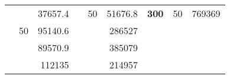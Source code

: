 \begin{table}[H]
\begin{tabular}{|ccrccrccc}
\rowcolor[HTML]{DDFDFF} 
\multicolumn{1}{|c|}{\cellcolor[HTML]{FFFFC7}}                                & \multicolumn{1}{c|}{\cellcolor[HTML]{DDFDFF}}                      & \multicolumn{1}{r|}{\cellcolor[HTML]{DAE8FC}37657.4}   & \multicolumn{1}{c|}{\cellcolor[HTML]{FFFFC7}}                                & \multicolumn{1}{c|}{\multirow{-10}{*}{\cellcolor[HTML]{DDFDFF}50}}  & \multicolumn{1}{r|}{\cellcolor[HTML]{DDFDFF}51676.8}   & \multicolumn{1}{c|}{\multirow{-19}{*}{\cellcolor[HTML]{FFFFC7}\textbf{300}}} & \multicolumn{1}{c|}{\multirow{-10}{*}{\cellcolor[HTML]{DDFDFF}50}} & \multicolumn{1}{r|}{\cellcolor[HTML]{DDFDFF}769369}    \\ \cline{3-3} \cline{5-9} 
\multicolumn{1}{|c|}{\cellcolor[HTML]{FFFFC7}}                                & \multicolumn{1}{c|}{\multirow{-10}{*}{\cellcolor[HTML]{DDFDFF}50}} & \multicolumn{1}{r|}{\cellcolor[HTML]{DDFDFF}95140.6}   & \multicolumn{1}{c|}{\cellcolor[HTML]{FFFFC7}}                                & \multicolumn{1}{c|}{\cellcolor[HTML]{DAE8FC}}                       & \multicolumn{1}{r|}{\cellcolor[HTML]{DAE8FC}286527}    &                                                                              &                                                                    &                                                        \\ \cline{2-3} \cline{6-6}
\multicolumn{1}{|c|}{\cellcolor[HTML]{FFFFC7}}                                & \multicolumn{1}{c|}{\cellcolor[HTML]{DAE8FC}}                      & \multicolumn{1}{r|}{\cellcolor[HTML]{DAE8FC}89570.9}   & \multicolumn{1}{c|}{\cellcolor[HTML]{FFFFC7}}                                & \multicolumn{1}{c|}{\cellcolor[HTML]{DAE8FC}}                       & \multicolumn{1}{r|}{\cellcolor[HTML]{DDFDFF}385079}    &                                                                              &                                                                    &                                                        \\ \cline{3-3} \cline{6-6}
\multicolumn{1}{|c|}{\cellcolor[HTML]{FFFFC7}}                                & \multicolumn{1}{c|}{\cellcolor[HTML]{DAE8FC}}                      & \multicolumn{1}{r|}{\cellcolor[HTML]{DDFDFF}112135}    & \multicolumn{1}{c|}{\cellcolor[HTML]{FFFFC7}}                                & \multicolumn{1}{c|}{\cellcolor[HTML]{DAE8FC}}                       & \multicolumn{1}{r|}{\cellcolor[HTML]{DAE8FC}214957}    &                                                                              &                                                                    &                                                        \\ \cline{3-3} \cline{6-6}

\end{tabular}
\end{table}
